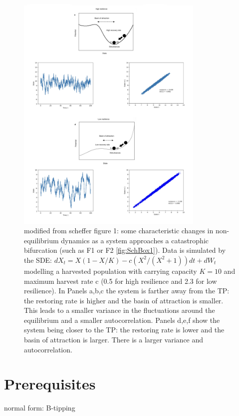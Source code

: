 \documentclass[%
thesis=student,%
coverpage=false,%
titlepage=false,%
headmarks=true, %
german,%
font=libertine, %
math=newpxtx, %
BCOR=5mm,%
coverBCOR=11mm%
]{tumbook}
\begin{document}
\begin{figure}[h]
    \centering
    \includegraphics[width=0.8\textwidth]{bachelor-thesis/figures/scheffer_fig1_reimp_v1.jpg}
    \caption{modified from scheffer figure 1: some characteristic changes in non-equilibrium dynamics as a system approaches a catastrophic bifurcation (such as F1 or F2 \ref{fig:SchBox1}). Data is simulated by the SDE: $dX_{t}=X(1-X/K)-c(X^2/(X^2+1))dt + dW_{t}$ modelling a harvested population with carrying capacity $K = 10$ and maximum harvest rate c (0.5 for high resilience and 2.3 for low resilience). In Panels a,b,c the system is farther away from the TP: the restoring rate is higher and the basin of attraction is smaller. This leads to a smaller variance in the fluctuations around the equilibrium and a smaller autocorrelation. Panels d,e,f show the system being closer to the TP: the restoring rate is lower and the basin of attraction is larger. There is a larger variance and autocorrelation.}
    \label{fig:enter-label}
\end{figure}



\chapter{Prerequisites}
normal form: B-tipping
\end{document}
